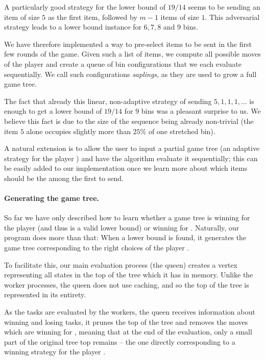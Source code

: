 A particularly good strategy for the lower bound of $19/14$ seems to
be sending an item of size $5$ as the first item, followed by $m-1$
items of size $1$. This adversarial strategy leads to a lower bound
instance for $6,7,8$ and $9$ bins.

We have therefore implemented a way to pre-select items to be sent in
the first few rounds of the game. Given such a list of items, we
compute all possible moves of the player \algo and create a queue of
bin configurations that we each evaluate sequentially. We call such
configurations \emph{saplings}, as they are used to grow a full game
tree.

The fact that already this linear, non-adaptive strategy of sending
$5,1,1,1,\ldots$ is enough to get a lower bound of $19/14$ for $9$
bins was a pleasant surprise to us. We believe this fact is due to the
size of the sequence being already non-trivial (the item $5$ alone
occupies slightly more than $25\%$ of one stretched bin).

A natural extension is to allow the user to input a partial game tree
(an adaptive strategy for the player \adversary) and have the
algorithm evaluate it sequentially; this can be easily added to our
implementation once we learn more about which items should be the
among the first to send.

\paragraph{Generating the game tree.} So far we have only described
how to learn whether a game tree is winning for the player \adversary
(and thus is a valid lower bound) or winning for \algo. Naturally, our
program does more than that: When a lower bound is found, it generates
the game tree corresponding to the right choices of the player
\adversary.

To facilitate this, our main evaluation process (the queen) creates a
vertex representing all states in the top of the tree which it has in
memory. Unlike the worker processes, the queen does not use caching,
and so the top of the tree is represented in its entirety.

As the tasks are evaluated by the workers, the queen receives
information about winning and losing tasks, it prunes the top of the
tree and removes the moves which are winning for \algo, meaning that
at the end of the evaluation, only a small part of the original tree
top remains -- the one directly corresponding to a winning strategy
for the player \adversary.

